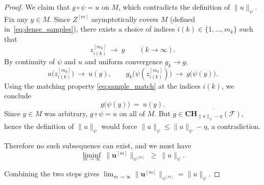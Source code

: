 \documentclass[12pt]{amsart}
\numberwithin{equation}{section}
\theoremstyle{remark}
\begin{document}
\begin{proof}
We claim that $g\circ\psi=u$ on $M$, which contradicts the definition of $\|u\|_\psi$.
Fix any $y\in M$. Since $Z^{[m]}$ asymptotically covers $M$ (defined in~\eqref{eq:dense_samples}), there exists a choice of indices $i(k)\in\{1,\dots,m_k\}$ such that
\begin{equation}
z^{[m_k]}_{i(k)}\ \to\ y\qquad (k\to\infty).
\end{equation}
By continuity of $\psi$ and $u$ and uniform convergence $g_k\to g$,
\begin{equation}
u\big(z^{[m_k]}_{i(k)}\big)\ \to\ u(y),\qquad
g_k\big(\psi(z^{[m_k]}_{i(k)})\big)\ \to\ g\big(\psi(y)\big).
\end{equation}
Using the matching property \eqref{eq:sample_match} at the indices $i(k)$, we conclude
\begin{equation}
g\big(\psi(y)\big)\ =\ u(y).
\end{equation}
Since $y\in M$ was arbitrary, $g\circ\psi=u$ on all of $M$. But $g\in \overline{\mathbf{CH}_{\|u\|_\psi-\eta}(\mathcal F)}$, hence the definition of $\|u\|_\psi$ would force $\|u\|_\psi\le \|u\|_\psi-\eta$, a contradiction.

Therefore no such subsequence can exist, and we must have
\begin{equation}
\liminf_{m\to\infty}\ \|\mathbf u^{[m]}\|_{\psi^{[m]}}\ \ge\ \|u\|_\psi.
\end{equation}

\medskip
Combining the two steps gives
\(
\displaystyle \lim_{m\to\infty}\|\mathbf u^{[m]}\|_{\psi^{[m]}}=\|u\|_\psi.
\)
\end{proof}
\end{document}
